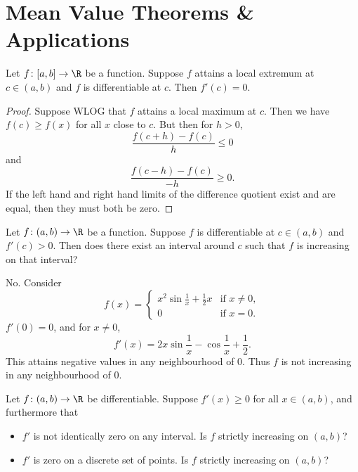 \section{Mean Value Theorems \& Applications} \label{sec:mvt}
\begin{theorem} \label{thm:stationary}
    Let $f\colon [a, b] \to \R$ be a function.
    Suppose $f$ attains a local extremum at $c \in (a, b)$ and $f$ is
    differentiable at $c$.
    Then $f'(c) = 0$.
\end{theorem}
\begin{proof}
    Suppose WLOG that $f$ attains a local maximum at $c$.
    Then we have $f(c) \ge f(x)$ for all $x$ close to $c$.
    But then for $h > 0$, \[
        \frac{f(c + h) - f(c)}{h} \le 0
    \] and \[
        \frac{f(c - h) - f(c)}{-h} \ge 0.
    \] If the left hand and right hand limits of the difference quotient
    exist and are equal, then they must both be zero.
\end{proof}

\begin{exercise}
    Let $f\colon (a, b) \to \R$ be a function.
    Suppose $f$ is differentiable at $c \in (a, b)$ and $f'(c) > 0$.
    Then does there exist an interval around $c$ such that $f$ is
    increasing on that interval?
\end{exercise}
\begin{solution}
    No.
    Consider \[
        f(x) = \begin{cases}
            x^2 \sin \frac{1}{x} + \frac12 x & \text{if } x \ne 0, \\
            0 & \text{if } x = 0.
        \end{cases}
    \] $f'(0) = 0$, and for $x \ne 0$, \[
        f'(x) = 2x \sin \frac1x - \cos \frac1x + \frac12.
    \] This attains negative values in any neighbourhood of $0$.
    Thus $f$ is not increasing in any neighbourhood of $0$.
\end{solution}

\begin{exercise}
    Let $f\colon (a, b) \to \R$ be differentiable.
    Suppose $f'(x) \ge 0$ for all $x \in (a, b)$, and furthermore that
    \begin{itemize}
        \item $f'$ is not identically zero on any interval.
        Is $f$ strictly increasing on $(a, b)$?
        \item $f'$ is zero on a discrete set of points.
        Is $f$ strictly increasing on $(a, b)$?
    \end{itemize}
\end{exercise}

